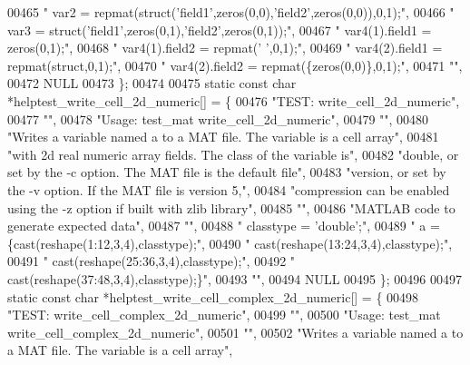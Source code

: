 \begin{DoxyCode}
{{00465     \textcolor{stringliteral}{"    var2 = repmat(struct('field1',zeros(0,0),'field2',zeros(0,0)),0,1);"},
00466     \textcolor{stringliteral}{"    var3 = struct('field1',zeros(0,1),'field2',zeros(0,1));"},
00467     \textcolor{stringliteral}{"    var4(1).field1 = zeros(0,1);"},
00468     \textcolor{stringliteral}{"    var4(1).field2 = repmat(' ',0,1);"},
00469     \textcolor{stringliteral}{"    var4(2).field1 = repmat(struct,0,1);"},
00470     \textcolor{stringliteral}{"    var4(2).field2 = repmat(\{zeros(0,0)\},0,1);"},
00471     \textcolor{stringliteral}{""},
00472     NULL
00473 \};
00474 
00475 \textcolor{keyword}{static} \textcolor{keyword}{const} \textcolor{keywordtype}{char} *helptest\_write\_cell\_2d\_numeric[] = \{
00476     \textcolor{stringliteral}{"TEST: write\_cell\_2d\_numeric"},
00477     \textcolor{stringliteral}{""},
00478     \textcolor{stringliteral}{"Usage: test\_mat write\_cell\_2d\_numeric"},
00479     \textcolor{stringliteral}{""},
00480     \textcolor{stringliteral}{"Writes a variable named a to a MAT file. The variable is a cell array"},
00481     \textcolor{stringliteral}{"with 2d real numeric array fields. The class of the variable is"},
00482     \textcolor{stringliteral}{"double, or set by the -c option. The MAT file is the default file"},
00483     \textcolor{stringliteral}{"version, or set by the -v option. If the MAT file is version 5,"},
00484     \textcolor{stringliteral}{"compression can be enabled using the -z option if built with zlib library"},
00485     \textcolor{stringliteral}{""},
00486     \textcolor{stringliteral}{"MATLAB code to generate expected data"},
00487     \textcolor{stringliteral}{""},
00488     \textcolor{stringliteral}{"    classtype = 'double';"},
00489     \textcolor{stringliteral}{"    a = \{cast(reshape(1:12,3,4),classtype);"},
00490     \textcolor{stringliteral}{"         cast(reshape(13:24,3,4),classtype);"},
00491     \textcolor{stringliteral}{"         cast(reshape(25:36,3,4),classtype);"},
00492     \textcolor{stringliteral}{"         cast(reshape(37:48,3,4),classtype);\}"},
00493     \textcolor{stringliteral}{""},
00494     NULL
00495 \};
00496 
00497 \textcolor{keyword}{static} \textcolor{keyword}{const} \textcolor{keywordtype}{char} *helptest\_write\_cell\_complex\_2d\_numeric[] = \{
00498     \textcolor{stringliteral}{"TEST: write\_cell\_complex\_2d\_numeric"},
00499     \textcolor{stringliteral}{""},
00500     \textcolor{stringliteral}{"Usage: test\_mat write\_cell\_complex\_2d\_numeric"},
00501     \textcolor{stringliteral}{""},
00502     \textcolor{stringliteral}{"Writes a variable named a to a MAT file. The variable is a cell array"},
}}
\end{DoxyCode}
